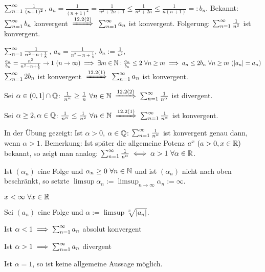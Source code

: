 \documentclass[a4paper,twoside,DIV15,BCOR12mm]{scrbook}
\begin{document}
\begin{beispiele}
\item $\sum_{n=1}^{\infty}{\frac{1}{(n+1)^2}}$, $a_n=\frac{1}{(n+1)^2} = \frac{1}{n^2+2n+1} \le \frac{1}{n^2+2n} \le \frac{1}{n(n+1)} =: b_n$. Bekannt: $\sum_{n=1}^{\infty}{b_n}$ konvergent $\folgtnach{12.2(2)}$ $\sum_{n=1}^{\infty}{a_n}$ ist konvergent. Folgerung: $\sum_{n=1}^{\infty}{\frac{1}{n^2}}$ ist konvergent.
\item $\sum_{n=1}^{\infty}{\frac{1}{n^2-n+\frac{1}{8}}}$, $a_n=\frac{1}{n^2-n+\frac{1}{8}}$, $b_n:=\frac{1}{n^2}$, $\frac{a_n}{b_n} = \frac{n^2}{n^2-n+\frac{1}{8}} \to 1 \ (n\to\infty) \folgt \exists m\in\MdN: \frac{a_n}{b_n} \le 2\ \forall n\ge m \folgt a_n \le 2 b_n \ \forall n\ge m\ (|a_n|=a_n)$\\
$\sum_{n=1}^{\infty}{2b_n}$ ist konvergent $\folgtnach{12.2(1)}$ $\sum_{n=1}^{\infty}{a_n}$ ist konvergent.
\item Sei $\alpha \in (0,1] \cap \mathbb{Q}$: $\frac{1}{n^\alpha} \ge \frac{1}{n} \ \forall n\in\MdN \folgtnach{12.2(2)} \reihe{\frac{1}{n^\alpha}}$ ist divergent.
\item Sei $\alpha \ge 2, \alpha \in \mathbb{Q}$: $\frac{1}{n^\alpha} \le \frac{1}{n^2} \ \forall n\in\MdN \folgtnach{12.2(1)} \reihe{\frac{1}{n^\alpha}}$ ist konvergent.
\item In der Übung gezeigt: Ist $\alpha > 0$, $\alpha \in\mathbb{Q}$: $\sum_{n=1}^{\infty}{\frac{1}{n^\alpha}}$ ist konvergent genau dann, wenn $\alpha > 1$. Bemerkung: Ist später die allgemeine Potenz $a^x \ (a>0,x\in\mathbb{R})$ bekannt, so zeigt man analog: $\sum_{n=1}^{\infty}{\frac{1}{n^\alpha}} \iff \alpha > 1 \ \forall \alpha\in\mathbb{R}$.
\end{beispiele}

\begin{definition}
Ist $(\alpha_n)$ eine Folge und $\alpha_n \ge 0 \ \forall n\in\mathbb{N}$ und ist $(\alpha_n)$ nicht nach oben beschränkt, so setzte $\limsup \alpha_n := \limsup_{n\to\infty} \alpha_n := \infty$.
\end{definition}
\begin{vereinbarung}
$x < \infty \ \forall x \in\mathbb{R}$
\end{vereinbarung}

\begin{satz}[Wurzelkriterium]
Sei $(a_n)$ eine Folge und $\alpha := \limsup \sqrt[n]{|a_n|}$.
\begin{liste}
 \item Ist $\alpha<1 \implies \sum_{n=1}^{\infty}{a_n}$ absolut konvergent
 \item Ist $\alpha>1 \implies \sum_{n=1}^{\infty}{a_n}$ divergent
 \item Ist $\alpha=1$, so ist keine allgemeine Aussage möglich.
\end{liste}
\end{satz}
\end{document}
